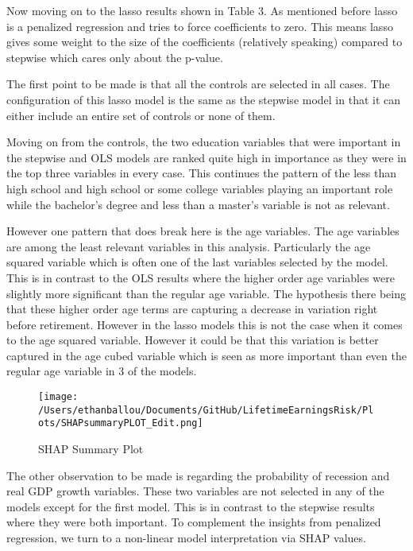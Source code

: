 \documentclass[12pt]{article}
\begin{document}
\begin{onehalfspace}



Now moving on to the lasso results shown in Table 3. As mentioned before lasso is a penalized regression and tries to force coefficients to zero. This means lasso gives some weight to the size of the coefficients (relatively speaking) compared to stepwise which cares only about the p-value. 

The first point to be made is that all the controls are selected in all cases. The configuration of this lasso model is the same as the stepwise model in that it can either include an entire set of controls or none of them. 

Moving on from the controls, the two education variables that were important in the stepwise and OLS models are ranked quite high in importance as they were in the top three variables in every case. This continues the pattern of the less than high school and high school or some college variables playing an important role while the bachelor's degree and less than a master's variable is not as relevant. 

However one pattern that does break here is the age variables. The age variables are among the least relevant variables in this analysis. Particularly the age squared variable which is often one of the last variables selected by the model. This is in contrast to the OLS results where the higher order age variables were slightly more significant than the regular age variable. The hypothesis there being that these higher order age terms are capturing a decrease in variation right before retirement. However in the lasso models this is not the case when it comes to the age squared variable. However it could be that this variation is better captured in the age cubed variable which is seen as more important than even the regular age variable in 3 of the models.


\begin{figure}[H]
    \centering
    \texttt{[image: /Users/ethanballou/Documents/GitHub/LifetimeEarningsRisk/Plots/SHAPsummaryPLOT\_Edit.png]}
    \caption{SHAP Summary Plot}
\end{figure}



The other observation to be made is regarding the probability of recession and real GDP growth variables. These two variables are not selected in any of the models except for the first model. This is in contrast to the stepwise results where they were both important. To complement the insights from penalized regression, we turn to a non-linear model interpretation via SHAP values.



\end{onehalfspace}
\end{document}

